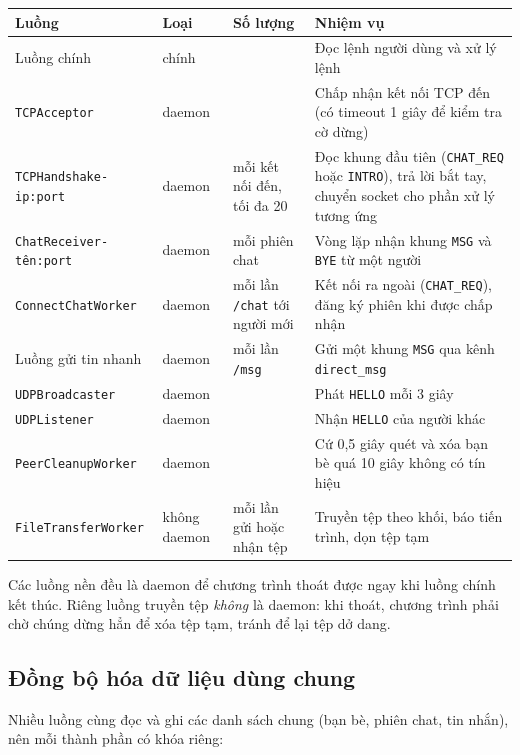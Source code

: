 \documentclass[a4paper,12pt]{article}
\newcommand{\code}[1]{\texttt{#1}}
\begin{document}
\begin{center}
\small
\begin{tabularx}{\textwidth}{@{}>{\raggedright\arraybackslash}p{4.3cm} p{1.7cm} >{\raggedright\arraybackslash}p{2.3cm} X@{}}
\toprule
\textbf{Luồng} & \textbf{Loại} & \textbf{Số lượng} & \textbf{Nhiệm vụ} \\
\midrule
Luồng chính & chính & 1 & Đọc lệnh người dùng và xử lý lệnh \\
\code{TCPAcceptor} & daemon & 1 & Chấp nhận kết nối TCP đến (có timeout 1 giây để kiểm tra cờ dừng) \\
\code{TCPHandshake-ip:port} & daemon & mỗi kết nối đến, tối đa 20 & Đọc khung đầu tiên (\code{CHAT\_REQ} hoặc \code{INTRO}), trả lời bắt tay, chuyển socket cho phần xử lý tương ứng \\
\code{ChatReceiver-tên:port} & daemon & mỗi phiên chat & Vòng lặp nhận khung \code{MSG} và \code{BYE} từ một người \\
\code{ConnectChatWorker} & daemon & mỗi lần \code{/chat} tới người mới & Kết nối ra ngoài (\code{CHAT\_REQ}), đăng ký phiên khi được chấp nhận \\
Luồng gửi tin nhanh & daemon & mỗi lần \code{/msg} & Gửi một khung \code{MSG} qua kênh \code{direct\_msg} \\
\code{UDPBroadcaster} & daemon & 1 & Phát \code{HELLO} mỗi 3 giây \\
\code{UDPListener} & daemon & 1 & Nhận \code{HELLO} của người khác \\
\code{PeerCleanupWorker} & daemon & 1 & Cứ 0,5 giây quét và xóa bạn bè quá 10 giây không có tín hiệu \\
\code{FileTransferWorker} & không daemon & mỗi lần gửi hoặc nhận tệp & Truyền tệp theo khối, báo tiến trình, dọn tệp tạm \\
\bottomrule
\end{tabularx}
\end{center}

Các luồng nền đều là daemon để chương trình thoát được ngay khi luồng chính kết thúc. Riêng luồng truyền tệp \emph{không} là daemon: khi thoát, chương trình phải chờ chúng dừng hẳn để xóa tệp tạm, tránh để lại tệp dở dang.

\subsection{Đồng bộ hóa dữ liệu dùng chung}
Nhiều luồng cùng đọc và ghi các danh sách chung (bạn bè, phiên chat, tin nhắn), nên mỗi thành phần có khóa riêng:
\end{document}
